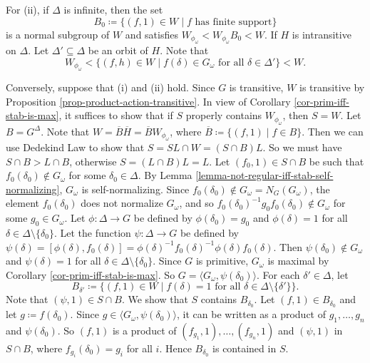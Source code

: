 \begin{sketch}
For (ii), if $\Delta$ is infinite, then the set
\begin{equation*}
	B_0 \coloneq \{ (f,1)\in W \mid \text{$f$ has finite support}\}
\end{equation*}
is a normal subgroup of $W$ and satisfies $W_{\phi_\omega}< W_{\phi_\omega} B_0 < W$. If $H$ is intransitive on $\Delta$. Let $\Delta'\subseteq \Delta$ be an orbit of $H$. Note that 
\begin{equation*}
	W_{\phi_\omega} < \{(f,h)\in W\mid f(\delta)\in G_\omega \text{ for all }\delta\in\Delta'\} < W.
\end{equation*}

Conversely, suppose that (i) and (ii) hold. Since $G$ is transitive, $W$ is transitive by Proposition \ref{prop-product-action-transitive}. In view of Corollary \ref{cor-prim-iff-stab-is-max}, it suffices to show that if $S$ properly contains $W_{\phi_\omega}$, then $S = W$. Let $B = G^\Delta$. Note that $W = \overline{B} \overline{H} = \overline{B} W_{\phi_\omega}$, where $\overline{B}  \coloneq \{(f,1)\mid f\in B\}$. Then we can use Dedekind Law to show that $S = SL\cap W = (S\cap B)L$. So we must have $S\cap B > L\cap B$, otherwise $S = (L\cap B)L = L$. Let $(f_0,1)\in S\cap B$ be such that $f_0(\delta_0)\not\in G_\omega$ for some $\delta_0\in\Delta$. By Lemma \ref{lemma-not-regular-iff-stab-self-normalizing}, $G_\omega$ is self-normalizing. Since $f_0(\delta_0)\not\in G_\omega = N_G(G_\omega)$, the element $f_0(\delta_0)$ does not normalize $G_\omega$, and so $f_0(\delta_0)^{-1}g_0 f_0(\delta_0) \not\in G_\omega$ for some $g_0\in G_\omega$. Let $\phi:\Delta\to G$ be defined by $\phi(\delta_0) = g_0$ and $\phi(\delta) = 1$ for all $\delta\in\Delta\setminus\{\delta_0\}$.  Let the function $\psi:\Delta\to G$ be defined by $\psi(\delta) = [\phi(\delta),f_0(\delta)] = \phi(\delta)^{-1}f_0(\delta)^{-1}\phi(\delta)f_0(\delta)$. Then  $\psi(\delta_0)\not\in G_\omega$ and $\psi(\delta) = 1$ for all $\delta\in\Delta\setminus\{\delta_0\}$.  Since $G$ is primitive, $G_\omega$ is maximal by Corollary \ref{cor-prim-iff-stab-is-max}. So $G = \langle G_\omega, \psi(\delta_0)\rangle$. For each $\delta'\in \Delta$, let 
\begin{equation*}
	B_{\delta'} \coloneq \{(f,1)\in W\mid f(\delta) = 1\text{ for all }\delta\in\Delta\setminus\{\delta'\}\}.
\end{equation*}
Note that $(\psi,1)\in S\cap B$. We show that $S$ contains $B_{\delta_0}$. Let $(f,1)\in B_{\delta_0}$ and let $g\coloneq f(\delta_0)$. Since $g\in \langle G_\omega, \psi(\delta_0)\rangle$, it can be written as a product of $g_1,\dots, g_n$ and $ \psi(\delta_0)$. So $(f,1)$ is a product of $(f_{g_1},1),\dots, (f_{g_n},1)$ and $(\psi,1)$ in $S\cap B$, where $f_{g_i}(\delta_0) = g_i$ for all $i$. Hence $B_{\delta_0}$ is contained in $S$. 


\end{sketch}
